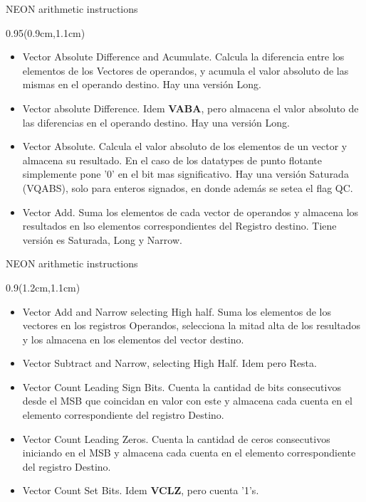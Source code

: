 \begin{frame}{NEON arithmetic instructions}
 \begin{textblock*}{0.95\textwidth}(0.9cm,1.1cm)
  \begin{itemize}\justifying
   \item [VABA] Vector Absolute Difference and Acumulate. Calcula la diferencia entre los elementos de los Vectores de operandos, y acumula el valor absoluto de las mismas en el operando destino. Hay una versión Long.
   \item [VABD] Vector absolute Difference. Idem \textbf{VABA}, pero almacena el valor absoluto de las diferencias en el operando destino. Hay una versión Long.
   \item [VABS] Vector Absolute. Calcula el valor absoluto de los elementos de un vector y almacena su resultado. En el caso de los datatypes de punto flotante simplemente pone '0' en el bit mas significativo. Hay una versión Saturada (VQABS), solo para enteros signados, en donde además se setea el flag QC.
   \item [VADD] Vector Add. Suma los elementos de cada vector de operandos y almacena los resultados en lso elementos correspondientes del Registro destino. Tiene versión es Saturada, Long y Narrow.
  \end{itemize}
 \end{textblock*}
\end{frame}

\begin{frame}{NEON arithmetic instructions}
 \begin{textblock*}{0.9\textwidth}(1.2cm,1.1cm)
  \begin{itemize}\justifying
   \item [VADDHN] Vector Add and Narrow selecting High half. Suma los elementos de los vectores en los registros Operandos, selecciona la mitad alta de los resultados y los almacena en los elementos del vector destino.
   \item [VSUBHN] Vector Subtract and Narrow, selecting High Half. Idem pero Resta.
   \item [VCLS] Vector Count Leading Sign Bits. Cuenta la cantidad de bits consecutivos desde el MSB que coincidan en valor con este y almacena cada cuenta en el elemento correspondiente del registro Destino.
   \item [VCLZ] Vector Count Leading Zeros. Cuenta la cantidad de ceros consecutivos iniciando en el MSB y almacena cada cuenta en el elemento correspondiente del registro Destino.
   \item [VCNT] Vector Count Set Bits. Idem \textbf{VCLZ}, pero cuenta '1's.
  \end{itemize}
 \end{textblock*}
\end{frame}

